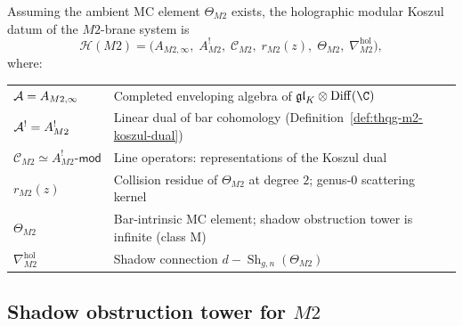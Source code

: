 \begin{conjecture}
Assuming the ambient MC element $\Theta_{M2}$ exists, the holographic
modular Koszul datum of the $M2$-brane system is
\begin{equation}%
\mathcal{H}(M2)
= \bigl(
A_{M2,\infty},\;
A^!_{M2},\;
\mathcal{C}_{M2},\;
r_{M2}(z),\;
\Theta_{M2},\;
\nabla^{\mathrm{hol}}_{M2}
\bigr),
\end{equation}
where:
\begin{center}
\renewcommand{\arraystretch}{1.35}
\small
\begin{tabular}{lp{9cm}}
\hline
$\mathcal{A} = A_{M2,\infty}$
 & Completed enveloping algebra of $\mathfrak{gl}_K \otimes
 \Diff(\C)$ \\
$\mathcal{A}^! = A^!_{M2}$
 & Linear dual of bar cohomology
 (Definition~\ref{def:thqg-m2-koszul-dual}) \\
$\mathcal{C}_{M2} \simeq A^!_{M2}\text{-}\mathsf{mod}$
 & Line operators: representations of the Koszul dual \\
$r_{M2}(z)$
 & Collision residue of $\Theta_{M2}$ at degree $2$;
 genus-$0$ scattering kernel \\
$\Theta_{M2}$
 & Bar-intrinsic MC element; shadow obstruction tower is infinite
 (class M) \\
$\nabla^{\mathrm{hol}}_{M2}$
 & Shadow connection $d - \operatorname{Sh}_{g,n}(\Theta_{M2})$
 \\
\hline
\end{tabular}
\end{center}
\end{conjecture}


\subsection{Shadow obstruction tower for $M2$}

